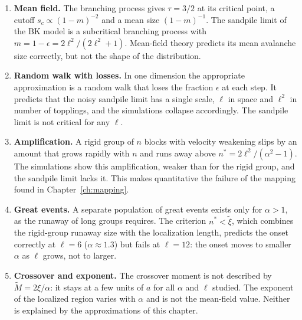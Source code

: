 \begin{enumerate}
  \item \textbf{Mean field.} The branching process gives $\tau=3/2$ at its critical point, a cutoff $s_c\propto(1-m)^{-2}$ and a mean size $(1-m)^{-1}$. The sandpile limit of the BK
    model is a subcritical branching process with $m = 1-\epsilon = 2\ell^2/(2\ell^2+1)$. Mean-field theory predicts its mean avalanche size correctly, but not the shape of the
    distribution.
  \item \textbf{Random walk with losses.} In one dimension the appropriate approximation is a random walk that loses the fraction $\epsilon$ at each step. It predicts that the noisy
    sandpile limit has a single scale, $\ell$ in space and $\ell^2$ in number of topplings, and the simulations collapse accordingly. The sandpile limit is not critical for any $\ell$.
  \item \textbf{Amplification.} A rigid group of $n$ blocks with velocity weakening slips by an amount that grows rapidly with $n$ and runs away above $n^* = 2\ell^2/(\alpha^2-1)$.
    The simulations show this amplification, weaker than for the rigid group, and the sandpile limit lacks it. This makes quantitative the failure of the mapping found in
    Chapter~\ref{ch:mapping}.
  \item \textbf{Great events.} A separate population of great events exists only for $\alpha>1$, as the runaway of long groups requires. The criterion $n^*<\tilde\xi$, which
    combines the rigid-group runaway size with the localization length, predicts the onset correctly at $\ell = 6$ ($\alpha\approx1.3$) but fails at $\ell = 12$: the onset moves to
    smaller $\alpha$ as $\ell$ grows, not to larger.
  \item \textbf{Crossover and exponent.} The crossover moment is not described by $\tilde M = 2\xi/\alpha$: it stays at a few units of $a$ for all $\alpha$ and $\ell$ studied. The exponent
    of the localized region varies with $\alpha$ and is not the mean-field value. Neither is explained by the approximations of this chapter.
\end{enumerate}
